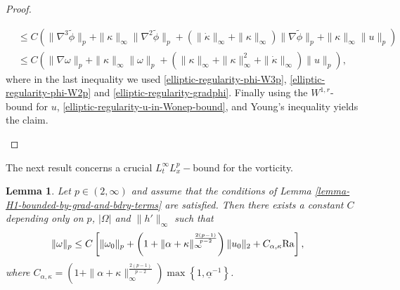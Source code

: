 \documentclass{article}
\newtheorem{lemma}[theorem]{Lemma}
\theoremstyle{definition}
\theoremstyle{definition}
\newcommand{\Ra}{{\rm{Ra}}}
\begin{document}
\begin{proof}
\begin{itemize}
\begin{align*}
        &\leq C\left(\|\nabla^3 \tilde\phi\|_p + \|\kappa\|_\infty \|\nabla^2 \tilde\phi\|_p + (\|\dot\kappa\|_\infty+\|\kappa\|_\infty)\|\nabla\tilde\phi\|_p + \|\kappa\|_\infty\|u\|_p \right)
        \\
        &\leq C\left(\|\nabla \omega\|_p +\|\kappa\|_\infty\|\omega\|_{p} + (\|\kappa\|_\infty+\|\kappa\|_\infty^2+\|\dot\kappa\|_\infty) \|u\|_p\right),
    \end{align*}
    where in the last inequality we used \eqref{elliptic-regularity-phi-W3p}, \eqref{elliptic-regularity-phi-W2p} and \eqref{elliptic-regularity-gradphi}.
    Finally using the $W^{1,r}$-bound for $u$, \eqref{elliptic-regularity-u-in-Wonep-bound}, and Young's inequality yields the claim.
\end{itemize}
\end{proof}

The next result concerns a crucial $L_t^{\infty}L^p_x-$bound for the vorticity.
\begin{lemma}\label{LemmaVorticityBound}
Let $p\in (2,\infty)$ and assume that the conditions of Lemma \ref{lemma-H1-bounded-by-grad-and-bdry-terms} are satisfied. Then there exists a constant $C$ depending only on $p$, $|\Omega|$ and $\|h'\|_{\infty}$ such that
\begin{align*}
    \|\omega\|_{p} &\leq  C\left[ \|\omega_0\|_p  +\left(1+\|\alpha+\kappa\|_\infty^{\frac{2(p-1)}{p-2}}\right)\|u_0\|_2+ C_{\alpha,\kappa}\Ra\right],
\end{align*}
where $C_{\alpha,\kappa}= \left(1+\|\alpha+\kappa\|_\infty^{\frac{2(p-1)}{p-2}}\right)\max\left\lbrace 1, \underline{\alpha}^{-1}\right\rbrace$.
\end{lemma}
\end{document}
